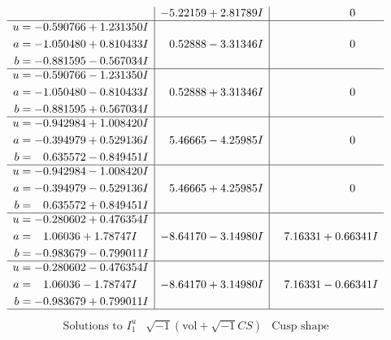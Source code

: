 \documentclass[1p]{elsarticle_modified}
\theoremstyle{definition}
\newcommand{\I}{\sqrt{-1}}
\begin{document}
$$\begin{array}{c|c|c}
 & -5.22159 + 2.81789 I & \phantom{-0.000000 } 0 \\ \hline\begin{aligned}
u &= -0.590766 + 1.231350 I \\
a &= -1.050480 + 0.810433 I \\
b &= -0.881595 - 0.567034 I\end{aligned}
 & \phantom{-}0.52888 - 3.31346 I & \phantom{-0.000000 } 0 \\ \hline\begin{aligned}
u &= -0.590766 - 1.231350 I \\
a &= -1.050480 - 0.810433 I \\
b &= -0.881595 + 0.567034 I\end{aligned}
 & \phantom{-}0.52888 + 3.31346 I & \phantom{-0.000000 } 0 \\ \hline\begin{aligned}
u &= -0.942984 + 1.008420 I \\
a &= -0.394979 + 0.529136 I \\
b &= \phantom{-}0.635572 - 0.849451 I\end{aligned}
 & \phantom{-}5.46665 - 4.25985 I & \phantom{-0.000000 } 0 \\ \hline\begin{aligned}
u &= -0.942984 - 1.008420 I \\
a &= -0.394979 - 0.529136 I \\
b &= \phantom{-}0.635572 + 0.849451 I\end{aligned}
 & \phantom{-}5.46665 + 4.25985 I & \phantom{-0.000000 } 0 \\ \hline\begin{aligned}
u &= -0.280602 + 0.476354 I \\
a &= \phantom{-}1.06036 + 1.78747 I \\
b &= -0.983679 - 0.799011 I\end{aligned}
 & -8.64170 - 3.14980 I & \phantom{-}7.16331 + 0.66341 I \\ \hline\begin{aligned}
u &= -0.280602 - 0.476354 I \\
a &= \phantom{-}1.06036 - 1.78747 I \\
b &= -0.983679 + 0.799011 I\end{aligned}
 & -8.64170 + 3.14980 I & \phantom{-}7.16331 - 0.66341 I\\
 \hline 
 \end{array}$$\newpage$$\begin{array}{c|c|c}  
\text{Solutions to }I^u_{1}& \I (\text{vol} + \sqrt{-1}CS) & \text{Cusp shape}\\

\end{array}$$
\end{document}
